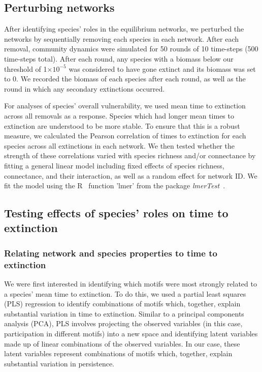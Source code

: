 \documentclass[12pt]{article}
\begin{document}
	\subsection*{Perturbing networks}

		After identifying species' roles in the equilibrium networks, we perturbed the networks by sequentially removing each species in each network. After each removal, community dynamics were simulated for 50 rounds of 10 time-steps (500 time-steps total). After each round, any species with a biomass below our threshold of 1$\times10^{-5}$ was considered to have gone extinct and its biomass was set to 0. We recorded the biomass of each species after each round, as well as the round in which any secondary extinctions occurred.


		For analyses of species' overall vulnerability, we used mean time to extinction across all removals as a response. Species which had longer mean times to extinction are understood to be more stable. To ensure that this is a robust measure, we calculated the Pearson correlation of times to extinction for each species across all extinctions in each network. We then tested whether the strength of these correlations varied with species richness and/or connectance by fitting a general linear model including fixed effects of species richness, connectance, and their interaction, as well as a random effect for network ID. We fit the model using the R~\citep{R} function 'lmer' from the package \emph{lmerTest}~\citep{lmerTest}.


	\subsection*{Testing effects of species' roles on time to extinction}

		\subsubsection*{Relating network and species properties to time to extinction}

			We were first interested in identifying which motifs were most strongly related to a species' mean time to extinction. 
			To do this, we used a partial least squares (PLS) regression to identify combinations of motifs which, together, explain substantial variation in time to extinction. 
			Similar to a principal components analysis (PCA), PLS involves projecting the observed variables (in this case, participation in different motifs) into a new space and identifying latent variables made up of linear combinations of the observed variables.
			In our case, these latent variables represent combinations of motifs which, together, explain substantial variation in persistence.
\end{document}
